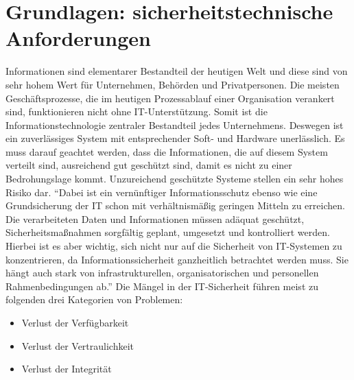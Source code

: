 \section{Grundlagen: sicherheitstechnische Anforderungen}\label{kap:sicherheitstechnischeAnforderungen}
Informationen sind elementarer Bestandteil der heutigen Welt und diese sind von sehr hohem Wert für Unternehmen, Behörden und Privatpersonen. Die meisten Geschäftsprozesse, die im heutigen Prozessablauf einer Organisation verankert sind, funktionieren nicht ohne IT-Unterstützung. Somit ist die Informationstechnologie zentraler Bestandteil jedes Unternehmens. Deswegen ist ein zuverlässiges System mit entsprechender Soft- und Hardware unerlässlich. Es muss darauf geachtet werden, dass die Informationen, die auf diesem System verteilt sind, ausreichend gut geschützt sind, damit es nicht zu einer Bedrohungslage kommt. Unzureichend geschützte Systeme stellen ein sehr hohes Risiko dar. \enquote{Dabei ist ein vernünftiger Informationsschutz ebenso wie eine Grundsicherung der IT schon mit verhältnismäßig geringen Mitteln zu erreichen. Die verarbeiteten Daten und Informationen müssen adäquat geschützt, Sicherheitsmaßnahmen sorgfältig geplant, umgesetzt und kontrolliert werden. Hierbei ist es aber wichtig, sich nicht nur auf die Sicherheit von IT-Systemen zu konzentrieren, da Informationssicherheit ganzheitlich betrachtet werden muss. Sie	hängt auch stark von infrastrukturellen, organisatorischen und personellen Rahmenbedingungen ab.}\autocite[][S.\,1]{bundesamt_fur_sicherheit_in_der_informationstechnik_bsi_it-grundschutz-kompendium_2020} Die Mängel in der IT-Sicherheit führen meist zu folgenden drei Kategorien von Problemen\autocite[vgl.][S.\,1ff.]{bundesamt_fur_sicherheit_in_der_informationstechnik_bsi_it-grundschutz-kompendium_2020}: 

\begin{itemize}
	\item Verlust der Verfügbarkeit
	\item Verlust der Vertraulichkeit
	\item Verlust der Integrität
\end{itemize}

